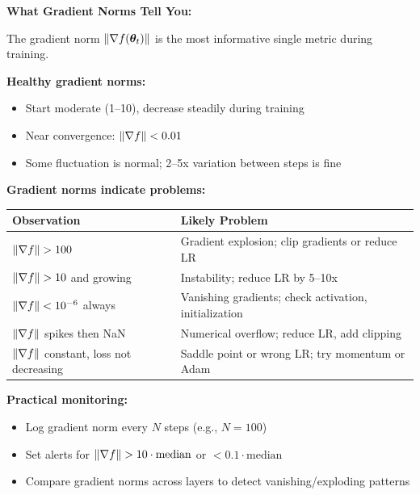 \documentclass[../../main.tex]{subfiles}
\begin{document}
\begin{important}
\textbf{What Gradient Norms Tell You:}

The gradient norm $\left\lVert \nabla f(\boldsymbol{\theta}_t) \right\rVert$ is the most informative single metric during training.

\textbf{Healthy gradient norms:}
\begin{itemize}
    \item Start moderate (1--10), decrease steadily during training
    \item Near convergence: $\left\lVert \nabla f \right\rVert < 0.01$
    \item Some fluctuation is normal; 2--5x variation between steps is fine
\end{itemize}

\textbf{Gradient norms indicate problems:}
\begin{center}
\begin{tabular}{ll}
\toprule
\textbf{Observation} & \textbf{Likely Problem} \\
\midrule
$\left\lVert \nabla f \right\rVert > 100$ & Gradient explosion; clip gradients or reduce LR \\
$\left\lVert \nabla f \right\rVert > 10$ and growing & Instability; reduce LR by 5--10x \\
$\left\lVert \nabla f \right\rVert < 10^{-6}$ always & Vanishing gradients; check activation, initialization \\
$\left\lVert \nabla f \right\rVert$ spikes then NaN & Numerical overflow; reduce LR, add clipping \\
$\left\lVert \nabla f \right\rVert$ constant, loss not decreasing & Saddle point or wrong LR; try momentum or Adam \\
\bottomrule
\end{tabular}
\end{center}

\textbf{Practical monitoring:}
\begin{itemize}
    \item Log gradient norm every $N$ steps (e.g., $N = 100$)
    \item Set alerts for $\left\lVert \nabla f \right\rVert > 10 \cdot \text{median}$ or $< 0.1 \cdot \text{median}$
    \item Compare gradient norms across layers to detect vanishing/exploding patterns
\end{itemize}
\end{important}
\end{document}
